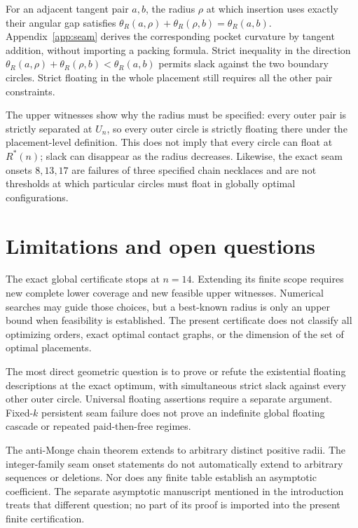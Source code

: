 \documentclass[11pt]{article}
\theoremstyle{definition}
\theoremstyle{remark}
\newcommand{\Rstar}{R^*}
\begin{document}
For an adjacent tangent pair $a,b$, the radius $\rho$ at which insertion
uses exactly their angular gap satisfies
$\theta_R(a,\rho)+\theta_R(\rho,b)=\theta_R(a,b)$.
Appendix~\ref{app:seam} derives the corresponding pocket curvature by
tangent addition, without importing a packing formula. Strict inequality
in the direction $\theta_R(a,\rho)+\theta_R(\rho,b)<\theta_R(a,b)$
permits slack against the two boundary circles. Strict floating in the
whole placement still requires all the other pair constraints.

The upper witnesses show why the radius must be specified: every outer
pair is strictly separated at $U_n$, so every outer circle is
strictly floating there under the placement-level definition. This does
not imply that every circle can float at $\Rstar(n)$; slack can disappear
as the radius decreases. Likewise, the exact seam onsets $8,13,17$ are
failures of three specified chain necklaces and are not thresholds at
which particular circles must float in globally optimal configurations.

\section{Limitations and open questions}
The exact global certificate stops at $n=14$. Extending its finite scope
requires new complete lower coverage and new feasible upper witnesses.
Numerical searches may guide those choices, but a best-known radius is only
an upper bound when feasibility is established. The present certificate
does not classify all optimizing orders, exact optimal contact graphs,
or the dimension of the set of optimal placements.

The most direct geometric question is to prove or refute the existential
floating descriptions at the exact optimum, with simultaneous strict slack
against every other outer circle. Universal floating assertions require
a separate argument. Fixed-$k$ persistent seam failure does not prove an
indefinite global floating cascade or repeated paid-then-free regimes.

The anti-Monge chain theorem extends to arbitrary distinct positive radii.
The integer-family seam onset statements do not automatically extend to
arbitrary sequences or deletions. Nor does any finite table establish an
asymptotic coefficient. The separate asymptotic manuscript mentioned in
the introduction treats that different question; no part of its proof is
imported into the present finite certification.
\end{document}
